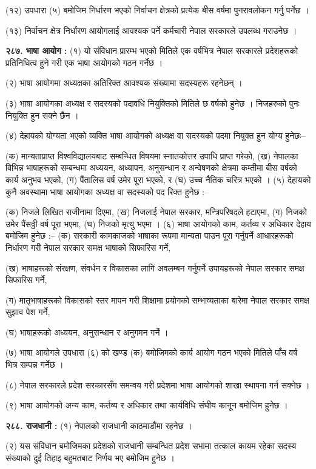 (१२) उपधारा (५) बमोजिम निर्धारण भएको निर्वाचन क्षेत्रको प्रत्येक बीस वर्षमा पुनरावलोकन गर्नु पर्नेछ ।

(१३) निर्वाचन क्षेत्र निर्धारण आयोगलाई आवश्यक पर्ने कर्मचारी नेपाल सरकारले उपलब्ध गराउनेछ ।

\textbf{२८७. भाषा आयोग :} (१) यो संविधान प्रारम्भ भएको मितिले एक वर्षभित्र नेपाल सरकारले प्रदेशहरूको प्रतिनिधित्व हुने गरी एक भाषा आयोगको गठन गर्नेछ ।

(२) भाषा आयोगमा अध्यक्षका अतिरिक्त आवश्यक संख्यामा सदस्यहरू रहनेछन् ।

(३) भाषा आयोगका अध्यक्ष र सदस्यको पदावधि नियुक्तिको मितिले छ वर्षको हुनेछ । निजहरुको पुनः नियुक्ति हुन सक्ने छैन ।

(४) देहायको योग्यता भएको व्यक्ति भाषा आयोगको अध्यक्ष वा सदस्यको पदमा नियुक्त हुन योग्य हुनेछः–

(क) मान्यताप्राप्त विश्वविद्यालयबाट सम्बन्धित विषयमा स्नातकोत्तर उपाधि प्राप्त गरेको,
(ख) नेपालका विभिन्न भाषाहरूको सम्बन्धमा अध्ययन, अध्यापन, अनुसन्धान र अन्वेषणको क्षेत्रमा कम्तीमा बीस वर्षको कार्य अनुभव भएको,
(ग) पैंतालिस वर्ष उमेर पूरा भएको, र
(घ) उच्च नैतिक चरित्र भएको ।
(५) देहायको कुनै अवस्थामा भाषा आयोगका अध्यक्ष वा सदस्यको पद रिक्त हुनेछ :–

(क) निजले लिखित राजीनामा दिएमा,
(ख) निजलाई नेपाल सरकार, मन्त्रिपरिषदले हटाएमा,
(ग) निजको उमेर पैंसठ्ठी वर्ष पूरा भएमा,
(घ) निजको मृत्यु भएमा ।
(६) भाषा आयोगको काम, कर्तव्य र अधिकार देहाय बमोजिम हुनेछ :–
(क) सरकारी कामकाजको भाषाका रूपमा मान्यता पाउन पूरा गर्नुपर्ने आधारहरूको निर्धारण गरी नेपाल सरकार समक्ष भाषाको सिफारिस गर्ने,

(ख) भाषाहरूको संरक्षण, संवर्धन र विकासका लागि अवलम्बन गर्नुपर्ने उपायहरूको नेपाल सरकार समक्ष सिफारिस गर्ने,

(ग) मातृभाषाहरूको विकासको स्तर मापन गरी शिक्षामा प्रयोगको सम्भाव्यताका बारेमा नेपाल सरकार समक्ष सुझाव पेश गर्ने,

(घ) भाषाहरूको अध्ययन, अनुसन्धान र अनुगमन गर्ने ।

(७) भाषा आयोगले उपधारा (६) को खण्ड (क) बमोजिमको कार्य आयोग गठन भएको मितिले पाँच वर्ष भित्र सम्पन्न गर्नेछ ।

(८) नेपाल सरकारले प्रदेश सरकारसँग समन्वय गरी प्रदेशमा भाषा आयोगको शाखा स्थापना गर्न सक्नेछ ।

(९) भाषा आयोगको अन्य काम, कर्तव्य र अधिकार तथा कार्यविधि संघीय कानून बमोजिम हुनेछ ।

\textbf{२८८. राजधानी :} (१) नेपालको राजधानी काठमाडौंमा रहनेछ ।

(२) यस संविधान बमोजिमका प्रदेशको राजधानी सम्बन्धित प्रदेश सभामा तत्काल कायम रहेका सदस्य संख्याको दुई तिहाइ बहुमतबाट निर्णय भए बमोजिम हुनेछ ।

